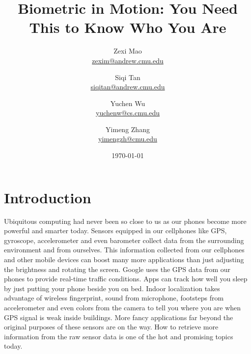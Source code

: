 \documentclass[12pt]{article}
\begin{document}

\title{Biometric in Motion: You Need This to Know Who You Are}
\author{
		Zexi Mao \\
		\href{mailto:zexim@andrew.cmu.edu}{zexim@andrew.cmu.edu} \\
	\and
		Siqi Tan \\
		\href{mailto:siqitan@andrew.cmu.edu}{siqitan@andrew.cmu.edu} \\
	\and
		Yuchen Wu \\
		\href{mailto:yuchenw@cs.cmu.edu}{yuchenw@cs.cmu.edu} \\
	\and
		Yimeng Zhang \\
		\href{mailto:yimengzh@cmu.edu}{yimengzh@cmu.edu}
	}
\date{\today}



\maketitle


\section{Introduction}

Ubiquitous computing had never been so close to us as our phones become more powerful and smarter today. Sensors equipped in our cellphones like GPS, gyroscope, accelerometer and even barometer collect data from the surrounding environment and from ourselves. This information collected from our cellphones and other mobile devices can boost many more applications than just adjusting the brightness and rotating the screen. Google uses the GPS data from our phones to provide real-time traffic conditions. Apps can track how well you sleep by just putting your phone beside you on bed. Indoor localization takes advantage of wireless fingerprint, sound from microphone, footsteps from accelerometer and even colors from the camera to tell you where you are when GPS signal is weak inside buildings. More fancy applications far beyond the original purposes of these sensors are on the way. How to retrieve more information from the raw sensor data is one of the hot and promising topics today.
\end{document}

